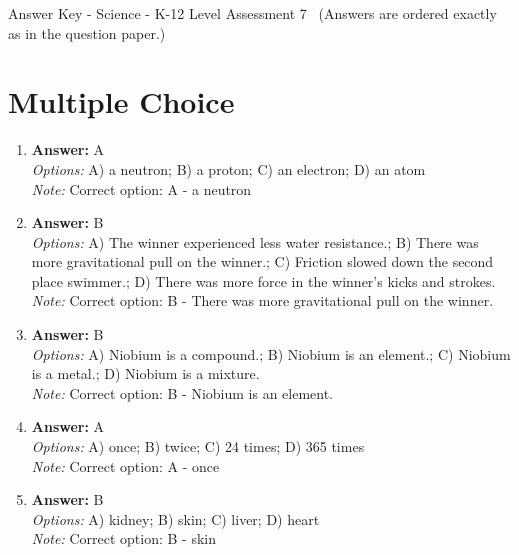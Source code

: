 \documentclass[12pt]{article}
\begin{document}
\begin{center}
Answer Key - Science - K-12 Level Assessment 7 \
\small (Answers are ordered exactly as in the question paper.)
\end{center}

\section*{Multiple Choice}
\begin{enumerate}[label=\arabic*.]
\item \textbf{Answer:} A
\\ \textit{Options:} A) a neutron; B) a proton; C) an electron; D) an atom
\\ \textit{Note:} Correct option: A - a neutron
\item \textbf{Answer:} B
\\ \textit{Options:} A) The winner experienced less water resistance.; B) There was more gravitational pull on the winner.; C) Friction slowed down the second place swimmer.; D) There was more force in the winner's kicks and strokes.
\\ \textit{Note:} Correct option: B - There was more gravitational pull on the winner.
\item \textbf{Answer:} B
\\ \textit{Options:} A) Niobium is a compound.; B) Niobium is an element.; C) Niobium is a metal.; D) Niobium is a mixture.
\\ \textit{Note:} Correct option: B - Niobium is an element.
\item \textbf{Answer:} A
\\ \textit{Options:} A) once; B) twice; C) 24 times; D) 365 times
\\ \textit{Note:} Correct option: A - once
\item \textbf{Answer:} B
\\ \textit{Options:} A) kidney; B) skin; C) liver; D) heart
\\ \textit{Note:} Correct option: B - skin
\end{enumerate}
\end{document}

